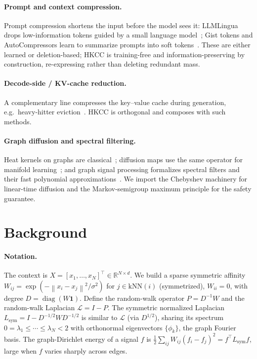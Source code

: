 \documentclass[11pt]{article}
\newcommand{\R}{\mathbb{R}}
\newcommand{\rwL}{\mathcal{L}}
\newcommand{\norm}[1]{\left\lVert#1\right\rVert}
\begin{document}
\paragraph{Prompt and context compression.}
Prompt compression shortens the input before the model sees it: LLMLingua drops low-information
tokens guided by a small language model~\cite{jiang2023llmlingua}; Gist tokens and
AutoCompressors learn to summarize prompts into soft
tokens~\cite{mu2023gist,chevalier2023autocompressors}. These are either learned or
deletion-based; HKCC is training-free and information-preserving by construction, re-expressing
rather than deleting redundant mass.

\paragraph{Decode-side / KV-cache reduction.}
A complementary line compresses the key--value cache during generation, e.g.\ heavy-hitter
eviction~\cite{zhang2023h2o}. HKCC is orthogonal and composes with such methods.

\paragraph{Graph diffusion and spectral filtering.}
Heat kernels on graphs are classical~\cite{kondor2002diffusion,chung1997spectral}; diffusion
maps use the same operator for manifold learning~\cite{coifman2006diffusion}; and graph signal
processing formalizes spectral filters and their fast polynomial
approximations~\cite{shuman2013emerging,hammond2011wavelets,defferrard2016chebnet}. We import the
Chebyshev machinery for linear-time diffusion and the Markov-semigroup maximum principle for the
safety guarantee.

\section{Background}
\label{sec:bg}

\paragraph{Notation.}
The context is $X=[x_1,\dots,x_N]^\top\in\R^{N\times d}$. We build a sparse symmetric affinity
$W_{ij}=\exp(-\norm{x_i-x_j}^2/\sigma^2)$ for $j\in\mathrm{kNN}(i)$ (symmetrized), $W_{ii}=0$,
with degree $D=\operatorname{diag}(W\mathbf 1)$. Define the random-walk operator $P=D^{-1}W$ and
the random-walk Laplacian $\rwL=I-P$. The symmetric normalized Laplacian
$L_{\mathrm{sym}}=I-D^{-1/2}WD^{-1/2}$ is similar to $\rwL$ (via $D^{1/2}$), sharing its spectrum
$0=\lambda_1\le\cdots\le\lambda_N<2$ with orthonormal eigenvectors $\{\phi_k\}$, the graph
Fourier basis. The graph-Dirichlet energy of a signal $f$ is
$\tfrac12\sum_{ij}W_{ij}(f_i-f_j)^2=f^\top L_{\mathrm{sym}}f$, large when $f$ varies sharply
across edges.
\end{document}
